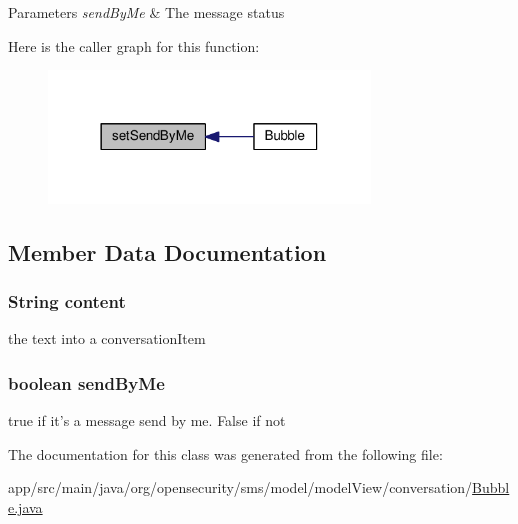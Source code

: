 \begin{DoxyParams}{Parameters}
{\em send\+By\+Me} & The message status \\
\hline
\end{DoxyParams}


Here is the caller graph for this function\+:
\nopagebreak
\begin{figure}[H]
\begin{center}
\leavevmode
\includegraphics[width=242pt]{a00004_a10871b9b5592dcf11e26eaed8e407682_icgraph}
\end{center}
\end{figure}




\subsection{Member Data Documentation}
\hypertarget{a00004_a5afce1c98d73512f8ffcb0482df23708}{
\subsubsection[{content}]{\setlength{\rightskip}{0pt plus 5cm}String content\hspace{0.3cm}{\ttfamily [private]}}}\label{a00004_a5afce1c98d73512f8ffcb0482df23708}
the text into a conversation\+Item \hypertarget{a00004_a87564ae3e1ae394e9b16de538dbf8067}{
\subsubsection[{send\+By\+Me}]{\setlength{\rightskip}{0pt plus 5cm}boolean send\+By\+Me\hspace{0.3cm}{\ttfamily [private]}}}\label{a00004_a87564ae3e1ae394e9b16de538dbf8067}
true if it's a message send by me. False if not 

The documentation for this class was generated from the following file\+:\begin{DoxyCompactItemize}
\item 
app/src/main/java/org/opensecurity/sms/model/model\+View/conversation/\hyperlink{a00021}{Bubble.\+java}\end{DoxyCompactItemize}

